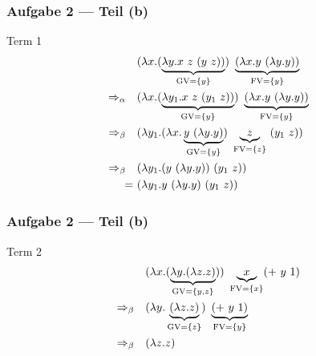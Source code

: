\documentclass{beamer}
\DeclareMathOperator{\GV}{GV}
\DeclareMathOperator{\FV}{FV}
\begin{document}
\begin{frame}[t] \frametitle{Aufgabe 2 --- Teil (b)}
	Term 1
	\begin{align*}
		&(\lambda x . (\underbrace{\lambda y . x \ z \ (y \ z))}_{\GV=\menge{y}}) \ \underbrace{(\lambda x . y \ (\lambda y . y))}_{\FV = \menge{y}}
		\\
		\Rightarrow_\alpha \quad
		& (\lambda x . (\underbrace{\lambda y_1 . x \ z \ (y_1 \ z))}_{\GV=\menge{y}}) \ \underbrace{(\lambda x . y \ (\lambda y . y))}_{\FV = \menge{y}}
		\\
		\Rightarrow_\beta \quad
		& (\lambda y_1 . (\lambda x . \underbrace{y \ (\lambda y . y)}_{\GV= \menge{y}}) \ \underbrace{z}_{\FV = \menge{z}} \ (y_1 \ z))
		\\
		\Rightarrow_\beta \quad
		& (\lambda y_1 . (y \ (\lambda y . y)) \ (y_1 \ z))
		\\
		= \ & (\lambda y_1 . y \ (\lambda y . y) \ (y_1 \ z))
	\end{align*}
\end{frame}


\begin{frame}[t] \frametitle{Aufgabe 2 --- Teil (b)}
	 Term 2
	\begin{align*}
		& (\lambda x . (\underbrace{\lambda y . (\lambda z . z)}_{\GV=\menge{y,z}})) \ \underbrace{x}_{\FV = \menge{x}} ( + \ y \ 1)
		\\
		\Rightarrow_\beta \quad
		& (\lambda y . \underbrace{(\lambda z . z)}_{\GV=\menge{z}}) \ \underbrace{( + \ y \ 1)}_{\FV = \menge{y}}
		\\
		\Rightarrow_\beta \quad
		& (\lambda z . z)
	\end{align*}
\end{frame}
\end{document}
